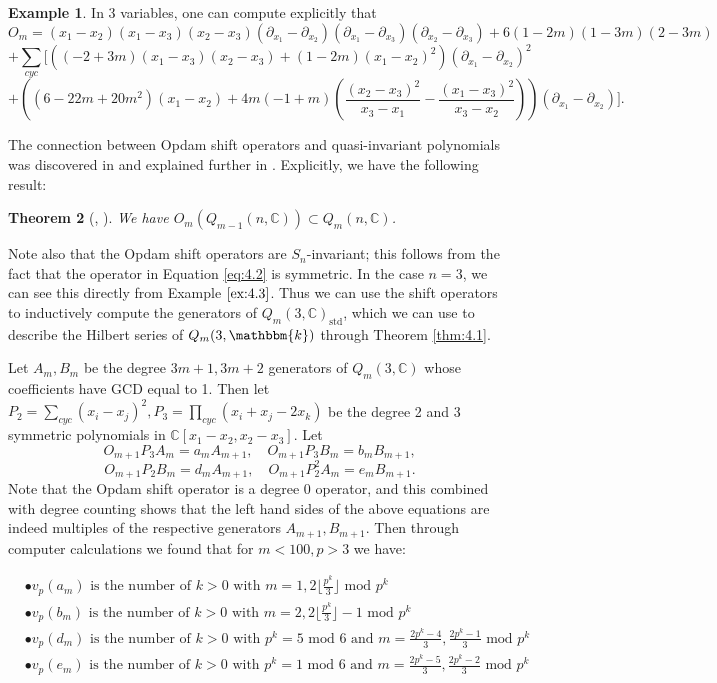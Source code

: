 \documentclass[11pt]{article}
\newtheorem{theorem}{Theorem}[section]
\theoremstyle{definition}
\newtheorem{example}[theorem]{Example}
\renewcommand{\k}{\mathbbm{k}}
\newcommand{\std}{\mathrm{std}}
\newcommand{\C}{\mathbb{C}}
\begin{document}
\begin{example}\label{ex:4.3}
    In 3 variables, one can compute explicitly that
    $$O_m=(x_1-x_2)(x_1-x_3)(x_2-x_3)(\partial_{x_1}-\partial_{x_2})(\partial_{x_1}-\partial_{x_3})(\partial_{x_2}-\partial_{x_3})+6(1-2m)(1-3m)(2-3m)$$$$+\sum_{cyc}\Bigg[\left((-2+3m)(x_1-x_3)(x_2-x_3)+(1-2m)(x_1-x_2)^2\right)(\partial_{x_1}-\partial_{x_2})^2$$$$+\left((6-22m+20m^2)(x_1-x_2)+4m(-1+m)\left(\frac{(x_2-x_3)^2}{x_3-x_1}-\frac{(x_1-x_3)^2}{x_3-x_2}\right)\right)(\partial_{x_1}-\partial_{x_2})\Bigg].$$
\end{example}

The connection between Opdam shift operators and quasi-invariant polynomials was discovered in \cite{berest2003cherednik} and explained further in \cite{shift}. Explicitly, we have the following result:

\begin{theorem}[\cite{berest2003cherednik}, \cite{shift}]
    We have $O_m(Q_{m-1}(n,\C))\subset Q_m(n,\C)$.
\end{theorem}

Note also that the Opdam shift operators are $S_n$-invariant; this follows from the fact that the operator in Equation \ref{eq:4.2} is symmetric. In the case $n=3$, we can see this directly from Example $\ref{ex:4.3}$. Thus we can use the shift operators to inductively compute the generators of $Q_m(3,\C)_\std$, which we can use to describe the Hilbert series of $Q_m(3,\k)$ through Theorem \ref{thm:4.1}. 

Let $A_m, B_m$ be the degree $3m+1,3m+2$ generators of $Q_m(3,\C)$ whose coefficients have GCD equal to 1. Then let $P_2=\sum_{cyc}(x_i-x_j)^2,P_3=\prod_{cyc}(x_i+x_j-2x_k)$ be the degree 2 and 3 symmetric polynomials in $\C[x_1-x_2,x_2-x_3]$. Let 
$$O_{m+1}P_3A_m=a_mA_{m+1},\quad O_{m+1}P_3B_m=b_mB_{m+1},$$$$O_{m+1}P_2B_m=d_mA_{m+1},\quad O_{m+1}P_2^2A_m=e_mB_{m+1}.$$
Note that the Opdam shift operator is a degree 0 operator, and this combined with degree counting shows that the left hand sides of the above equations are indeed multiples of the respective generators $A_{m+1},B_{m+1}$. Then through computer calculations we found that for $m<100,p>3$ we have:

\begin{align}
    &\bullet v_p(a_m)\text{ is the number of }k>0\text{ with }m=1, 2\lfloor \frac{p^k}{3}\rfloor\text{ mod }p^k\tag{4.3}\label{4.3}\\
    &\bullet v_p(b_m)\text{ is the number of }k>0\text{ with }m=2, 2\lfloor\frac{p^k}{3}\rfloor-1\text{ mod } p^k\tag{4.4}\label{4.4}\\
    &\bullet v_p(d_m)\text{ is the number of }k>0\text{ with }p^k=5\text{ mod }6\text{ and }m=\frac{2p^k-4}{3}, \frac{2p^k-1}{3}\text{ mod }p^k\tag{4.5}\label{4.5}\\
    &\bullet v_p(e_m)\text{ is the number of }k>0\text{ with }p^k=1\text{ mod }6\text{ and }m=\frac{2p^k-5}{3}, \frac{2p^k-2}{3}\text{ mod }p^k\tag{4.6}\label{4.6}
\end{align}
\end{document}
